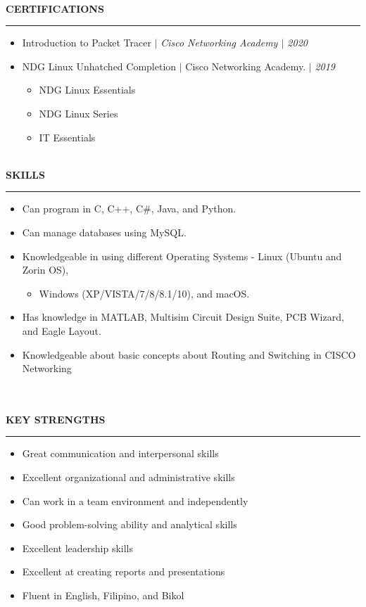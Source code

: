 \documentclass{amsbook}
\begin{document}
\noindent
\\
\textbf{CERTIFICATIONS}
\\
\rule{\textwidth}{1pt} 
\noindent
    \begin{itemize}
        \item Introduction to Packet Tracer $|$ \textit{Cisco Networking Academy $|$ 2020}
        \item NDG Linux Unhatched Completion $|$ Cisco Networking Academy. $|$ \textit{2019}
        \begin{itemize}
            \item NDG Linux Essentials
            \item NDG Linux Series
            \item IT Essentials
        \end{itemize}
    \end{itemize}
\noindent
\\
\textbf{SKILLS}
\\
\rule{\textwidth}{1pt} 
\noindent
\begin{itemize}
        \item Can program in C, C++,  C\#, Java, and Python.
        \item Can manage databases using MySQL\@.
        \item Knowledgeable in using different Operating Systems \@- Linux (Ubuntu and Zorin OS),
        \begin{itemize}[itemindent=-0.5cm]
            \item[]Windows (XP/VISTA/7/8/8.1/10), and macOS\@. 
        \end{itemize}
        \item Has knowledge in MATLAB, Multisim Circuit Design Suite, PCB Wizard, and Eagle Layout.
        \item Knowledgeable about basic concepts about Routing and Switching in CISCO Networking
\end{itemize}
\noindent
\\
\noindent
\\
\textbf{KEY STRENGTHS}
\\
\rule{\textwidth}{1pt} 
\noindent
\begin{itemize}
    \item Great communication and interpersonal skills
    \item Excellent organizational and administrative skills
    \item Can work in a team environment and independently
    \item Good problem-solving ability and analytical skills
    \item Excellent leadership skills
    \item Excellent at creating reports and presentations
    \item Fluent in English, Filipino, and Bikol
\end{itemize}
\noindent
\\\\
\end{document}
